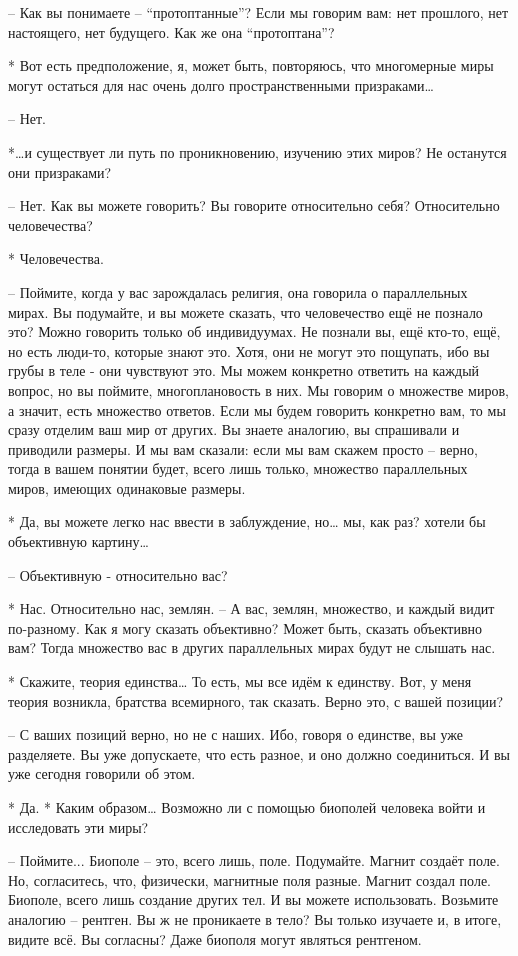  – Как вы понимаете – “протоптанные”? Если мы говорим вам: нет прошлого, нет настоящего, нет будущего. Как же она “протоптана”?

 * Вот есть предположение, я, может быть, повторяюсь, что многомерные миры могут остаться для нас очень долго пространственными призраками…

 – Нет.

 *…и существует ли путь по проникновению, изучению этих миров? Не останутся они призраками?

 – Нет. Как вы можете говорить? Вы говорите относительно себя? Относительно человечества?

 * Человечества.

 – Поймите, когда у вас зарождалась религия, она говорила о параллельных мирах. Вы подумайте, и вы можете сказать, что человечество ещё не познало это? Можно говорить только об индивидуумах. Не познали вы, ещё кто-то, ещё, но есть люди-то, которые знают это. Хотя, они не могут это пощупать, ибо вы грубы в  теле - они чувствуют это. Мы можем конкретно ответить на каждый вопрос, но вы поймите, многоплановость в них. Мы говорим о множестве миров, а значит, есть множество ответов. Если мы будем говорить конкретно вам, то мы сразу отделим ваш мир от других. Вы знаете аналогию, вы спрашивали и приводили размеры. И мы вам сказали: если мы вам скажем просто – верно, тогда в вашем понятии будет, всего лишь только, множество параллельных миров, имеющих одинаковые размеры.

 * Да, вы можете легко нас ввести в заблуждение, но… мы, как раз? хотели бы объективную картину…

 – Объективную - относительно вас?

 * Нас. Относительно нас, землян.
 – А вас, землян, множество, и каждый видит по-разному. Как я могу сказать объективно? Может быть, сказать объективно вам? Тогда множество вас в других параллельных мирах будут не слышать нас.

 * Скажите, теория единства… То есть, мы все идём к единству. Вот, у меня теория возникла, братства всемирного, так сказать. Верно это, с вашей позиции?

 – С ваших позиций верно, но не с наших. Ибо, говоря о единстве, вы уже разделяете. Вы уже допускаете, что есть разное, и оно должно соединиться. И вы уже сегодня говорили об этом.

 * Да.
 * Каким образом… Возможно ли с помощью биополей человека войти и исследовать эти миры?

 – Поймите... Биополе – это, всего лишь, поле. Подумайте. Магнит создаёт поле. Но, согласитесь, что, физически, магнитные поля разные. Магнит создал поле. Биополе, всего лишь создание других тел. И вы можете использовать. Возьмите аналогию – рентген. Вы ж не проникаете в тело? Вы только изучаете и, в итоге, видите всё. Вы согласны? Даже биополя могут являться рентгеном.

